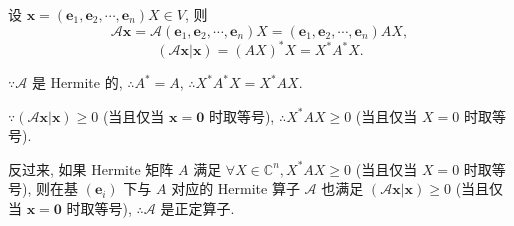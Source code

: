 \documentclass[color=black,device=normal,lang=cn,mode=geye]{elegantnote}
\begin{document}
设 $\boldsymbol{x}=(\boldsymbol{e}_1,\boldsymbol{e}_2,\cdots,\boldsymbol{e}_n)X\in V$, 则
\[\mathcal{A}\boldsymbol{x}=\mathcal{A}(\boldsymbol{e}_1,\boldsymbol{e}_2,\cdots,\boldsymbol{e}_n)X=(\boldsymbol{e}_1,\boldsymbol{e}_2,\cdots,\boldsymbol{e}_n)AX,\]
\[(\mathcal{A}\boldsymbol{x}|\boldsymbol{x})=(AX)^*X=X^*A^*X.\]

$\because\mathcal{A}$ 是 Hermite 的, $\therefore A^*=A$, $\therefore X^*A^*X=X^*AX$.

$\because(\mathcal{A}\boldsymbol{x}|\boldsymbol{x})\geq0$ (当且仅当 $\boldsymbol{x}=\boldsymbol{0}$ 时取等号), $\therefore X^*AX\geq0$ (当且仅当 $X=0$ 时取等号).

反过来, 如果 Hermite 矩阵 $A$ 满足 $\forall X\in\mathbb{C}^n,X^*AX\geq0$ (当且仅当 $X=0$ 时取等号), 则在基 $(\boldsymbol{e}_i)$ 下与 $A$ 对应的 Hermite 算子 $\mathcal{A}$ 也满足 $(\mathcal{A}\boldsymbol{x}|\boldsymbol{x})\geq0$ (当且仅当 $\boldsymbol{x}=\boldsymbol{0}$ 时取等号), $\therefore\mathcal{A}$ 是正定算子.
\end{document}
